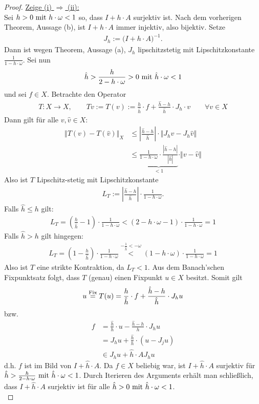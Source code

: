 \begin{proof}
\underline{Zeige (i) $\Rightarrow$ (ii):}\\
Sei $h>0\mit h\cdot\omega<1$ so, dass $I+h\cdot A$ surjektiv ist. Nach dem vorherigen Theorem, Aussage (b), ist $I+h\cdot A$ immer injektiv, also bijektiv. Setze
\begin{align*}
J_h:=\big(I+h\cdot A\big)^{-1}.
\end{align*}
Dann ist wegen Theorem, Aussage (a), $J_h$ lipschitzstetig mit Lipschitzkonstante $\frac{1}{1-h\cdot\omega}$. Sei nun 
\begin{align*}
\hat{h}>\frac{h}{2-h\cdot\omega}>0\mit\hat{h}\cdot\omega<1
\end{align*}
und sei $f\in X$. Betrachte den Operator
\begin{align*}
T:X\to X,\qquad Tv:=T(v)
:=\frac{h}{\hat{h}}\cdot f+\frac{\hat{h}-h}{\hat{h}}\cdot J_h\cdot v\qquad\forall v\in X
\end{align*}
Dann gilt für alle $v,\hat{v}\in X$:
\begin{align*}
\big\Vert T(v)-T(\hat{v})\big\Vert_X
&\leq
\left|\frac{\hat{h}-h}{\hat{h}}\right|\cdot\big\Vert J_h v-J_h \hat{v}\big\Vert\\
&\leq
\underbrace{\frac{1}{1-h\cdot\omega}\cdot\frac{|\hat{h}-h|}{|\hat{h}|}}_{<1}\cdot\Vert v-\hat{v}\Vert
\end{align*}
Also ist $T$ Lipschitz-stetig mit Lipschitzkonstante 
\begin{align*}
L_T:=\left|\frac{\hat{h}-h}{\hat{h}}\right|
\cdot\frac{1}{1-h\cdot\omega}.
\end{align*}
Falls $\hat{h}\leq h$ gilt:
\begin{align*}
L_T=\left(\frac{h}{\hat{h}}-1\right)\cdot\frac{1}{1-h\cdot\omega}
<
(2-h\cdot\omega-1)\cdot\frac{1}{1-h\cdot\omega}
=1
\end{align*}
Falls $\hat{h}>h$ gilt hingegen:
\begin{align*}
L_T=\left(1-\frac{h}{\hat{h}}\right)\cdot\frac{1}{1-h\cdot\omega}
\stackrel{-\frac{1}{\hat{h}}<-\omega}{<}
(1-h\cdot\omega)\cdot\frac{1}{1-h\cdot\omega}
=1
\end{align*}
Also ist $T$ eine strikte Kontraktion, da $L_T<1$. Aus dem Banach'schen Fixpunktsatz folgt, dass $T$ (genau) einen Fixpunkt $u\in X$ besitzt. Somit gilt
\begin{align*}
u\stackeq{\text{Fix}}T(u)
=\frac{h}{\hat{h}}\cdot f+\frac{\hat{h}-h}{\hat{h}}\cdot J_h u
\end{align*}
bzw. 
\begin{align*}
f&=\frac{\hat{h}}{h}\cdot u-\frac{\hat{h}-h}{h}\cdot J_h u\\
&=J_h u+\frac{\hat{h}}{h}\cdot\left(u-J_j u\right)\\
&\in J_h u+\hat{h}\cdot A J_h u
\end{align*}
d.h. $f$ ist im Bild von $I+\hat{h}\cdot A$. Da $f\in X$ beliebig war, ist $I+\hat{h}\cdot A$ surjektiv für $\hat{h}>\frac{h}{2-h\cdot\omega}\mit \hat{h}\cdot\omega<1$. Durch Iterieren des Arguments erhält man schließlich, dass $I+\hat{h}\cdot A$ surjektiv ist für alle $\hat{h}>0\mit\hat{h}\cdot\omega<1$.\\


\end{proof}
